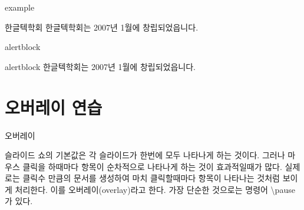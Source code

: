 \documentclass[10pt,xcolor=pdftex,dvipsnames,table,handout]{beamer}
\begin{document}
		\begin{frame}[t]{example}

			\begin{example} {한글텍학회}
			한글텍학회는 2007년 1월에 창립되었읍니다.	
			\end{example}

		\end{frame}


		\begin{frame}[t]{alertblock}

			\begin{alertblock} {alertblock}
			한글텍학회는 2007년 1월에 창립되었읍니다.	
			\end{alertblock}

		\end{frame}







		\section{오버레이 연습} 




		\begin{frame}[t]{오버레이}

		슬라이드 쇼의 기본값은 각 슬라이드가 한번에 모두 나타나게 하는 것이다.
		그러나 마우스 클릭을 하때마다 항목이 순차적으로 나타나게 하는 것이 효과적일때가 많다.
		실제로는 클릭수 만큼의 문서를 생성하여 마치 클릭할때마다 항목이 나타나는 것처럼 보이게 처리한다. 
		이를 오버레이(overlay)라고 한다. 가장 단순한 것으로는 명령어 \textbackslash pause가 있다.


		\end{frame}
\end{document}
